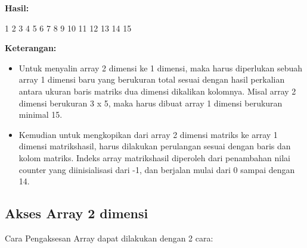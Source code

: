 \textbf{Hasil:}

\begin{lcverbatim}
1
2
3
4
5
6
7
8
9
10
11
12
13
14
15
\end{lcverbatim}

\textbf{Keterangan:}

\begin{itemize}

\item
  Untuk menyalin array 2 dimensi ke 1 dimensi, maka harus diperlukan
  sebuah array 1 dimensi baru yang berukuran total sesuai dengan hasil
  perkalian antara ukuran baris matriks dua dimensi dikalikan kolomnya.
  Misal array 2 dimensi berukuran 3 x 5, maka harus dibuat array 1
  dimensi berukuran minimal 15.
\item
  Kemudian untuk mengkopikan dari array 2 dimensi matriks ke array 1
  dimensi matrikshasil, harus dilakukan perulangan sesuai dengan baris
  dan kolom matriks. Indeks array matrikshasil diperoleh dari penambahan
  nilai counter yang diinisialisasi dari -1, dan berjalan mulai dari 0
  sampai dengan 14.
\end{itemize}

\subsection{Akses Array 2 dimensi}
 
Cara Pengaksesan Array dapat dilakukan dengan 2 cara:


